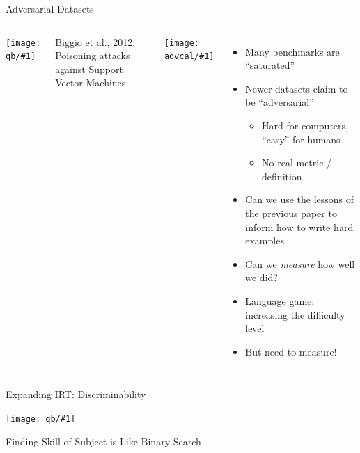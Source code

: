 \documentclass[compress]{beamer}
\newcommand{\gfxq}[2]{
\begin{center}
	\texttt{[image: qb/\#1]}
\end{center}
}
\newcommand{\gfxa}[2]{
	\begin{center}
		\texttt{[image: advcal/\#1]}
	\end{center}
}
\begin{document}
  \begin{frame}{Adversarial Datasets}

    \begin{columns}
      \gfxq{benchmark_saturation}{0.75}
Biggio et al., 2012: Poisoning attacks against Support Vector Machines

              \gfxa{adversarial_turtle}{.6}


            \begin{itemize}
              
            \item Many benchmarks are ``saturated''
            \item Newer datasets claim to be ``adversarial''
              \begin{itemize}
              \item Hard for computers, ``easy'' for humans
              \item No real metric / definition
              \end{itemize}
            \item Can we use the lessons of the previous paper to inform how to write hard examples
            \item Can we \emph{measure} how well we did?
              \pause
            \item Language game: increasing the difficulty level
              \item But need to measure!
    \end{itemize}
            \end{columns}
 \end{frame}

    \begin{frame}{Expanding IRT: Discriminability}

    \gfxq{discrimination}{1.0}

      \end{frame}
    
    \begin{frame}{Finding Skill of Subject is Like Binary Search}
    	\only<1>{\gfxq{discrimination_1}{1.0}}
    	\only<2>{\gfxq{discrimination_2}{1.0}}
    	\only<3>{\gfxq{discrimination_3}{1.0}}
    	\only<4>{\gfxq{discrimination_4}{1.0}}
    	\only<5>{\gfxq{discrimination_5}{1.0}}
    \end{frame}
    
\end{document}
